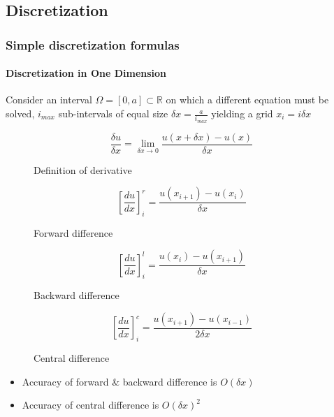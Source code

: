\documentclass[a4paper,11pt]{scrartcl}
\begin{document}
\subsection{Discretization}

\subsubsection{Simple discretization formulas}

\paragraph{Discretization in One Dimension}
Consider an interval $\Omega = [0,a] \subset \mathds{R}$ on which a different equation must be solved, $i_{max}$ sub-intervals of equal size $\delta x = \frac{a}{i_{max}}$ yielding a grid $x_i = i \delta x$
\begin{figure}[H]
	\centering
	\[ \frac{\delta u}{\delta x} = \lim\limits_{\delta x \rightarrow 0} \frac{u(x + \delta x) - u(x)}{\delta x}\]
    \renewcommand{\thefigure}{3.1}
	\caption{Definition of derivative}
	\label{fig:deriv-def}
\end{figure}

\begin{figure}[H]
	\centering
	\[ \left[\frac{d u}{d x}\right]^r_i = \frac{u(x_{i+1}) - u(x_i)}{\delta x}\]
    \renewcommand{\thefigure}{3.2}
	\caption{Forward difference}
	\label{fig:deriv-forward}
\end{figure}

\begin{figure}[H]
	\centering
	\[ \left[\frac{d u}{d x}\right]^l_i = \frac{u(x_i) - u(x_{i+1})}{\delta x}\]
    \renewcommand{\thefigure}{3.3}
	\caption{Backward difference}
	\label{fig:deriv-backward}
\end{figure}

\begin{figure}[H]
	\centering
	\[ \left[\frac{d u}{d x}\right]^c_i = \frac{u(x_{i+1}) - u(x_{i-1})}{2 \delta x}\]
    \renewcommand{\thefigure}{3.4}
	\caption{Central difference}
	\label{fig:deriv-central}
\end{figure}

\begin{itemize}
	\item Accuracy of forward \& backward difference is $O(\delta x)$
	\item Accuracy of central difference is $O(\delta x)^2$
\end{itemize}
\end{document}
